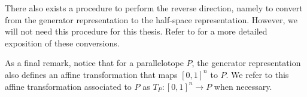 There also exists a procedure to perform the reverse direction, namely to convert from the generator representation to the half-space representation. However, we will not need this procedure for this thesis. Refer to \cite{dang2014parameter} for a more detailed exposition of these conversions.

As a final remark, notice that for a parallelotope $P$, the generator representation also defines an affine transformation that maps $[0,1]^{n}$ to $P$.
%
We refer to this affine transformation associated to $P$ as $T_P:[0,1]^n \rightarrow P$ when necessary.



